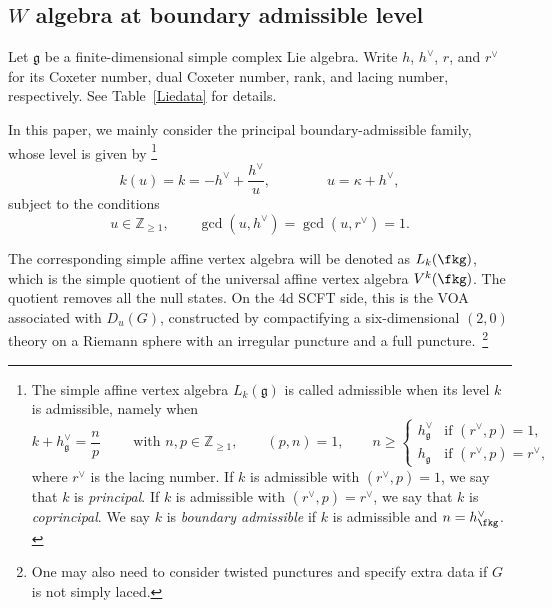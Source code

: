 \documentclass[a4paper,11pt]{article}
\theoremstyle{definition}
\theoremstyle{definition}
\theoremstyle{remark}
\newcommand{\be}{\begin{equation}}
\newcommand{\ee}{\end{equation}}
\begin{document}
 
\subsection{$W$ algebra at boundary admissible level  }
\label{gw-subsec-domain}

Let $\mathfrak g$ be a finite-dimensional simple complex Lie algebra.
Write $h$, $h^\vee$, $r$, and $r^\vee$ for its Coxeter number, dual
Coxeter number, rank, and lacing number, respectively.  See Table~\ref{Liedata} for   details.
 
 
In this paper, we mainly consider the  principal boundary-admissible family, whose level is given by
  \footnote{The simple affine vertex algebra $ L_k(\mathfrak{g})$ is called admissible when its level $k$ is admissible, namely when \cite{KacWakimoto1988} 
\be
k + h^\vee_{\mathfrak{g}} = \frac{n}{p}\qquad \text{ with } n,p \in \mathbb{Z}_{\ge 1}, \qquad (p, n) = 1,\qquad n \ge 
\begin{cases} 
h^\vee_{\mathfrak{g}} &   \text{if } (r^\vee, p) = 1, \\  
h_{\mathfrak{g}} & \text{if } (r^\vee, p) = r^\vee,
\end{cases}\nonumber
\ee
where $ r^\vee$ is the lacing number. 
If $ k$ is admissible with $ (r^\vee, p) = 1$, we say that $ k$ is  \emph{principal}. If $ k$ is admissible with $ (r^\vee, p) = r^\vee$, we say that $ k$ is  \emph{coprincipal}.  We say $k$ is \emph{boundary admissible } if $k$ is admissible and $ n=h^\vee_\fkg$. 
\label{admiscond}
}
\be\label{klevel}
 k(u)=k=-h^\vee+\frac{h^\vee}{u}, \qquad \qquad u =\kappa +h^\vee,
\ee
 subject to the conditions  
\be
 u\in\mathbb Z_{\geq1},\qquad
 \gcd(u,h^\vee)=\gcd(u,r^\vee)=1.
 \label{gw-eq-admissibility}
\ee
   
   The  corresponding simple affine  vertex algebra will be denoted as $L_k(\fkg)$, which is the simple quotient of the universal affine vertex algebra  $V^k(\fkg)$.  
The quotient removes all the null states. On the 4d SCFT side,   this is the VOA associated with $D_u(G)$, constructed by compactifying a six-dimensional $(2,0)$ theory on a Riemann sphere with an irregular puncture and a full puncture.~\footnote{One may also need to consider twisted punctures and specify extra data if $G$ is not simply laced. } 
\end{document}
